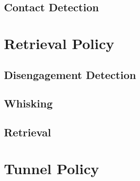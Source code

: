 \subsection{Contact Detection}


\section{Retrieval Policy}

\subsection{Disengagement Detection}

\subsection{Whisking}

\subsection{Retrieval}


\section{Tunnel Policy}


\section{}
